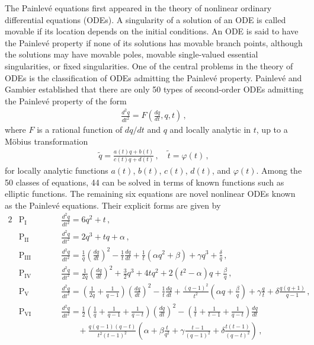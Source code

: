 \documentclass[11pt, a4paper]{article}
\theoremstyle{definition}
\begin{document}
The Painlev\'e equations first appeared in the theory of nonlinear ordinary differential equations (ODEs). A singularity of a solution of an ODE is called movable if its location depends on the initial conditions. An ODE is said to have the Painlev\'e property if none of its solutions has movable branch points, although the solutions may have movable poles, movable single-valued essential singularities, or fixed singularities. One of the central problems in the theory of ODEs is the classification of ODEs admitting the Painlev\'e property. Painlev\'e and Gambier \cite{Painleve:1900, Painleve:1902, Gambier:1910} established that there are only 50 types of second-order ODEs admitting the Painlev\'e property of the form
\begin{align}
    \frac{d^2 q}{dt^2} = F\left( \frac{dq}{dt}, q, t \right) \, ,
\end{align}
where $ F $ is a rational function of $ dq/dt $ and $ q $ and locally analytic in $ t $, up to a M\"obius transformation
\begin{align}
    \tilde{q} = \frac{a(t)q+b(t)}{c(t)q + d(t)} \, , \quad
    \tilde{t} = \varphi(t) \, ,
\end{align}
for locally analytic functions $ a(t) $, $ b(t) $, $ c(t) $, $ d(t) $, and $ \varphi(t) $. Among the 50 classes of equations, 44 can be solved in terms of known functions such as elliptic functions. The remaining six equations are novel nonlinear ODEs known as the Painlev\'e equations. Their explicit forms are given by
\begin{alignat}{2} \label{eq:Painleve}
    &\mathrm{P}_\mathrm{I} &&\qquad \frac{d^2q}{dt^2} = 6q^2 + t \, , \\
    &\mathrm{P}_\mathrm{II} &&\qquad \frac{d^2q}{dt^2} = 2q^3 + tq + \alpha \, , \nonumber \\
    &\mathrm{P}_\mathrm{III} &&\qquad \frac{d^2q}{dt^2} = \frac{1}{q} \left( \frac{dq}{dt}\right)^2 - \frac{1}{t} \frac{dq}{dt} + \frac{1}{t} \left( \alpha q^2 + \beta \right) + \gamma q^3 + \frac{\delta}{q} \, , \nonumber \\
    &\mathrm{P}_\mathrm{IV} &&\qquad \frac{d^2q}{dt^2} = \frac{1}{2q} \left( \frac{dq}{dt}\right)^2 + \frac{3}{2} q^3 + 4tq^2 + 2(t^2-\alpha)q + \frac{\beta}{q} \, , \nonumber \\
    &\mathrm{P}_\mathrm{V} &&\qquad \frac{d^2q}{dt^2} = \left( \frac{1}{2q} + \frac{1}{q-1} \right) \left( \frac{dq}{dt}\right)^2 - \frac{1}{t} \frac{dq}{dt} + \frac{(q-1)^2}{t^2} \left( \alpha q + \frac{\beta}{q} \right) + \gamma \frac{q}{t} + \delta \frac{q(q+1)}{q-1} \, , \nonumber \\
    &\mathrm{P}_\mathrm{VI} &&\qquad \frac{d^2q}{dt^2} = \frac{1}{2} \left( \frac{1}{q} + \frac{1}{q-1} + \frac{1}{q-t} \right) \left( \frac{dq}{dt}\right)^2 - \left( \frac{1}{t} + \frac{1}{t-1} + \frac{1}{q-t} \right) \frac{dq}{dt} \nonumber \\
    & && \qquad \qquad + \frac{q(q-1)(q-t)}{t^2(t-1)^2} \left( \alpha + \beta\frac{t}{q^2} + \gamma \frac{t-1}{(q-1)^2} + \delta \frac{t(t-1)}{(q-t)^2} \right) \, , \nonumber
\end{alignat}
\end{document}

